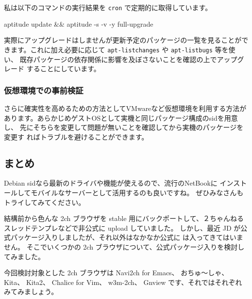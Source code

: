 \documentclass[mingoth,a4paper]{jsarticle}
\begin{document}
私は以下のコマンドの実行結果を \texttt{cron} で定期的に取得しています。

\begin{commandline}
aptitude update && aptitude -s -v -y full-upgrade
\end{commandline}

実際にアップグレードはしませんが更新予定のパッケージの一覧を見ることがで
きます。これに加え必要に応じて \texttt{apt-listchanges} や
\texttt{apt-listbugs} 等を使い、
既存パッケージの依存関係に影響を及ぼさないことを確認の上でアップグレード
することにしています。

\subsubsection{仮想環境での事前検証}

さらに確実性を高めるための方法としてVMwareなど仮想環境を利用する方法が
あります。あらかじめゲストOSとして実機と同じパッケージ構成のsidを用意し、
先にそちらを変更して問題が無いことを確認してから実機のパッケージを変更す
ればトラブルを避けることができます。

\subsection{まとめ}

Debian sidなら最新のドライバや機能が使えるので、流行のNetBookに
インストールしてモバイルなサーバーとして活用するのも良いですね。
ぜひみなさんもトライしてみてください。


結構前から色んな 2ch ブラウザを stable 用にバックポートして、２ちゃんねる
スレッドテンプレなどで非公式に upload していました。
しかし、最近 JD が公式パッケージ入りしましたが、それ以外はなかなか公式に
は入ってきてはいません。
そこでいくつかの 2ch ブラウザについて、公式パッケージ入りを検討してみました。

今回検討対象とした 2ch ブラウザは
 Navi2ch for Emacs、
 おちゅ〜しゃ、
 Kita、
 Kita2、
 Chalice for Vim、
 w3m-2ch、
 Gnview
です、それではそれぞれみてみましょう。

\newcommand{\yamamotobrowserlist}[2]{%
\begin{tabular}{|p{30zw}|p{20zw}|}
\hline 
#2 & #1\\
\hline 
\end{tabular}
}
\end{document}
